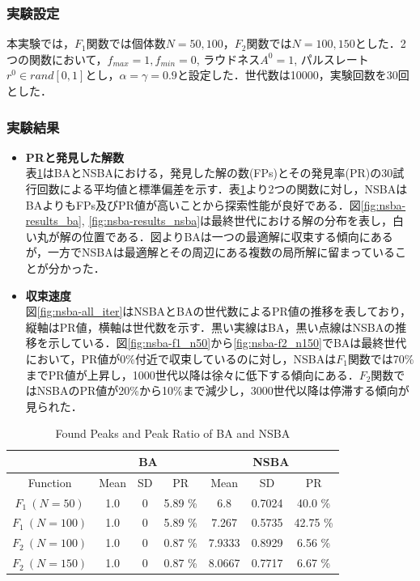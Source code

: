 \documentclass[a4j,11pt]{jarticle}
\begin{document}
\subsubsection{実験設定}
\label{sss:nsba-setup}
本実験では，$F_1$関数では個体数$N=50,100$，$F_2$関数では$N=100,150$とした．2つの関数において，$f_{max}=1, f_{min}=0$, ラウドネス$A^0=1$, パルスレート$r^0 \in rand[0,1]$とし，$\alpha = \gamma = 0.9$と設定した．世代数は10000，実験回数を30回とした．

\subsubsection{実験結果}
\label{sss:nsba-results}
\begin{itemize}
\item {\bf PRと発見した解数} \\
表\ref{tab:nsba}はBAとNSBAにおける，発見した解の数(FPs)とその発見率(PR)の30試行回数による平均値と標準偏差を示す．表\ref{tab:nsba}より2つの関数に対し，NSBAはBAよりもFPs及びPR値が高いことから探索性能が良好である．図\ref{fig:nsba-results_ba}, \ref{fig:nsba-results_nsba}は最終世代における解の分布を表し，白い丸が解の位置である．図よりBAは一つの最適解に収束する傾向にあるが，一方でNSBAは最適解とその周辺にある複数の局所解に留まっていることが分かった．
\item {\bf 収束速度} \\
図\ref{fig:nsba-all_iter}はNSBAとBAの世代数によるPR値の推移を表しており，縦軸はPR値，横軸は世代数を示す．黒い実線はBA，黒い点線はNSBAの推移を示している．図\ref{fig:nsba-f1_n50}から\ref{fig:nsba-f2_n150}でBAは最終世代において，PR値が0\%付近で収束しているのに対し，NSBAは$F_1$関数では70\%までPR値が上昇し，1000世代以降は徐々に低下する傾向にある．$F_2$関数ではNSBAのPR値が20\%から10\%まで減少し，3000世代以降は停滞する傾向が見られた．
\end{itemize}  

\begin{table}[h]
\caption{Found Peaks and Peak Ratio of BA and NSBA}
\begin{center}
\begin{tabular}{c|c|c|c|c|c|c}
\hline
\multicolumn{1}{c|}{} & \multicolumn{3}{c|}{BA} & \multicolumn{3}{c}{NSBA}  \\
\hline
Function & Mean & SD & PR & Mean & SD & PR \\
\hline
$F_1 \ (N=50)$ & 1.0 & 0 & 5.89 \% & 6.8 & 0.7024 & 40.0 \% \\
\hline
$F_1 \ (N=100)$ & 1.0 & 0 & 5.89 \% & 7.267 & 0.5735 & 42.75 \% \\
\hline
$F_2 \ (N=100)$ & 1.0 & 0 & 0.87 \% & 7.9333 & 0.8929 & 6.56 \% \\
\hline
$F_2 \ (N=150)$ & 1.0 & 0 & 0.87 \% & 8.0667 & 0.7717 & 6.67 \% \\
\hline
\end{tabular}
\label{tab:nsba}
\end{center}
\end{table}
\FloatBarrier
\end{document}
